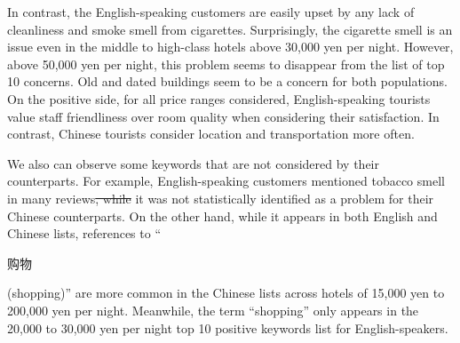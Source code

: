 \documentclass[smallextended,natbib]{svjour3}       %
\providecommand{\DIFadd}[1]{{\protect\color{blue}\uwave{#1}}} %
\providecommand{\DIFdel}[1]{{\protect\color{red}\sout{#1}}}                      %
\providecommand{\DIFaddbegin}{} %
\providecommand{\DIFaddend}{} %
\providecommand{\DIFdelbegin}{} %
\providecommand{\DIFdelend}{} %
\newcommand{\DIFscaledelfig}{0.5}
\newlength{\DIFdelgraphicswidth} %
\newlength{\DIFdelgraphicsheight} %
\newcommand{\DIFaddincludegraphics}[2][]{{\color{blue}\fbox{\DIFOincludegraphics[#1]{#2}}}} %
\newcommand{\DIFdelincludegraphics}[2][]{%
\sbox{\DIFdelgraphicsbox}{\DIFOincludegraphics[#1]{#2}}%
\settoboxwidth{\DIFdelgraphicswidth}{\DIFdelgraphicsbox} %
\settoboxtotalheight{\DIFdelgraphicsheight}{\DIFdelgraphicsbox} %
\scalebox{\DIFscaledelfig}{%
\parbox[b]{\DIFdelgraphicswidth}{\usebox{\DIFdelgraphicsbox}\\[-\baselineskip] \rule{\DIFdelgraphicswidth}{0em}}\llap{\resizebox{\DIFdelgraphicswidth}{\DIFdelgraphicsheight}{%
\setlength{\unitlength}{\DIFdelgraphicswidth}%
\begin{picture}(1,1)%
\thicklines\linethickness{2pt} %
{\color[rgb]{1,0,0}\put(0,0){\framebox(1,1){}}}%
{\color[rgb]{1,0,0}\put(0,0){\line( 1,1){1}}}%
{\color[rgb]{1,0,0}\put(0,1){\line(1,-1){1}}}%
\end{picture}%
}\hspace*{3pt}}} %
} %
\DeclareRobustCommand{\DIFaddbegin}{\DIFOaddbegin \let\includegraphics\DIFaddincludegraphics} %
\DeclareRobustCommand{\DIFaddend}{\DIFOaddend \let\includegraphics\DIFOincludegraphics} %
\DeclareRobustCommand{\DIFdelbegin}{\DIFOdelbegin \let\includegraphics\DIFdelincludegraphics} %
\DeclareRobustCommand{\DIFdelend}{\DIFOaddend \let\includegraphics\DIFOincludegraphics} %
\begin{document}
    In contrast, the English-speaking customers are easily upset by any lack of cleanliness and smoke smell from cigarettes. Surprisingly, the cigarette smell is an issue even in the middle to high-class hotels above 30,000 yen per night. However, above 50,000 yen per night, this problem seems to disappear from the list of top 10 concerns. Old and dated buildings seem to be a concern for both populations. On the positive side, for all price ranges considered, English-speaking tourists value staff friendliness over room quality when considering their satisfaction. In contrast, Chinese tourists consider location and transportation more often.

    We also can observe some keywords that are not considered by their counterparts. For example, English-speaking customers mentioned tobacco smell in many reviews\DIFdelbegin \DIFdel{, while }\DIFdelend \DIFaddbegin \DIFadd{. However, }\DIFaddend it was not statistically identified as a problem for their Chinese counterparts. On the other hand, while it appears in both English and Chinese lists, references to ``\begin{CJK}{UTF8}{gbsn}购物\end{CJK} (shopping)'' are more common in the Chinese lists across hotels of 15,000 yen to 200,000 yen per night. Meanwhile, the term ``shopping'' only appears in the 20,000 to 30,000 yen per night top 10 positive keywords list for English-speakers.
\end{document}

